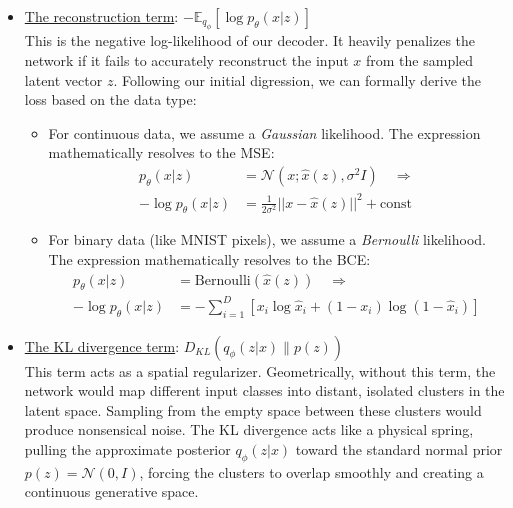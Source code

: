\begin{itemize}
    \item \underline{The reconstruction term}: $- \mathbb{E}_{q_\phi}[\log p_\theta(x|z)]$ \\ This is the negative log-likelihood of our decoder. It heavily penalizes the network if it fails to accurately reconstruct the input $x$ from the sampled latent vector $z$. Following our initial digression, we can formally derive the loss based on the data type:
    \begin{itemize}
        \item[-] For continuous data, we assume a \textit{Gaussian} likelihood. The expression mathematically resolves to the MSE:
        \begin{equation*}
        \begin{aligned}
            p_\theta(x|z) &= \mathcal{N}(x; \hat{x}(z), \sigma^2 I) \quad \Rightarrow \\
            -\log p_\theta(x|z) &= \frac{1}{2\sigma^2} ||x - \hat{x}(z)||^2 + \text{const}
        \end{aligned}
        \end{equation*}
        
        \item[-] For binary data (like MNIST pixels), we assume a \textit{Bernoulli} likelihood. The expression mathematically resolves to the BCE:
        \begin{equation*}
        \begin{aligned}
            p_\theta(x|z) &= \text{Bernoulli}(\hat{x}(z)) \quad \Rightarrow \\
            -\log p_\theta(x|z) &= -\sum_{i=1}^{D} [x_i \log \hat{x}_i + (1 - x_i) \log(1 - \hat{x}_i)]
        \end{aligned}
        \end{equation*}
    \end{itemize}
    
    \item \underline{The KL divergence term}: $D_{KL}(q_\phi(z|x) \parallel p(z))$ \\ This term acts as a spatial regularizer. Geometrically, without this term, the network would map different input classes into distant, isolated clusters in the latent space. Sampling from the empty space between these clusters would produce nonsensical noise. The KL divergence acts like a physical spring, pulling the approximate posterior $q_\phi(z|x)$ toward the standard normal prior $p(z) = \mathcal{N}(0, I)$, forcing the clusters to overlap smoothly and creating a continuous generative space.
    

\end{itemize}
